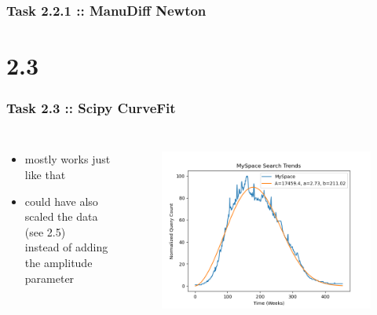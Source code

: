 \documentclass[10pt,aspectratio=169,handout]{beamer}
\begin{document}
\begin{frame}
    \frametitle{Task 2.2.1 :: ManuDiff Newton}
\end{frame}

\section{2.3}
\begin{frame}
    \frametitle{Task 2.3 :: Scipy CurveFit}
    \inputminted[bgcolor=LightGray,fontsize=\small]{python}{code/curve-fit.py}

    \begin{columns}
        \begin{column}{0.7\textwidth}
            \begin{itemize}
                \item mostly works just like that
                \item could have also scaled the data (see 2.5) \\
                        instead of adding the amplitude parameter
            \end{itemize}
        \end{column}
    
        \begin{column}{0.3\textwidth}
            \begin{figure}
                \includegraphics[width=\textwidth]{images/scicurvefit.png}
            \end{figure}
        \end{column}
        \end{columns}
\end{frame}
\end{document}
